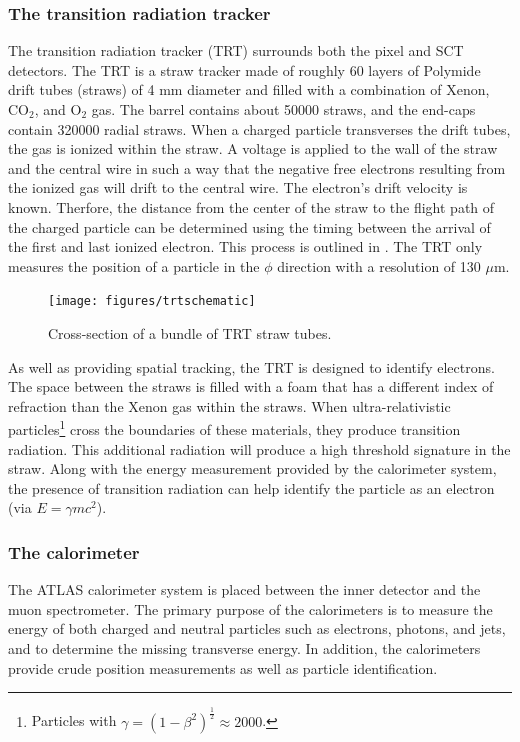 \subsubsection*{The transition radiation tracker}
The transition radiation tracker (TRT) surrounds both the pixel and SCT detectors.
The TRT is a straw tracker made of roughly 60 layers of 
Polymide drift tubes (straws) of 4 mm diameter and filled with a combination
of Xenon, CO$_2$, and O$_2$ gas. 
The barrel contains about 50000 straws, and the end-caps contain 320000 radial straws.
When a charged particle transverses the drift tubes, the gas is ionized within
the straw. A voltage is applied to the wall of the straw and the central wire in
such a way that the negative free electrons resulting from the ionized gas
will drift to the central wire. The electron's drift velocity is known. Therfore,
the distance from the center of the straw to the flight path of the charged
particle can be determined using the timing between the arrival of the first
and last ionized electron. This process is outlined in . The
TRT only measures the position of a particle in the $\phi$ direction with
a resolution of 130 $\mu$m.

\begin{figure}[!hbpt]
  \centering
  \texttt{[image: figures/trtschematic]}
  \caption{Cross-section of a bundle of TRT straw tubes.}
  \label{fig:trt}
\end{figure}

As well as providing spatial tracking, the TRT is designed to identify
electrons. The space between the straws is filled with a foam that has
a different index of refraction than the Xenon gas within the straws. When
ultra-relativistic particles\footnote{Particles with $\gamma = (1 - \beta^2)^{\frac{1}{2}} \approx 2000$.} cross the boundaries of these materials, they produce
transition radiation. This additional radiation will produce a high threshold
signature in the straw. Along with the energy measurement provided by the
calorimeter system, the presence of transition radiation can help identify
the particle as an electron (via $E = \gamma m c^2$).
 

\subsubsection{The calorimeter}
\label{subsubsec:calo}
The ATLAS calorimeter system is placed between the inner detector and the muon
spectrometer. The primary purpose of the calorimeters is to measure the energy
of both charged and neutral particles such as electrons, photons, and jets, 
and to determine the missing transverse energy. 
In addition, the calorimeters provide crude position measurements
as well as particle identification.

